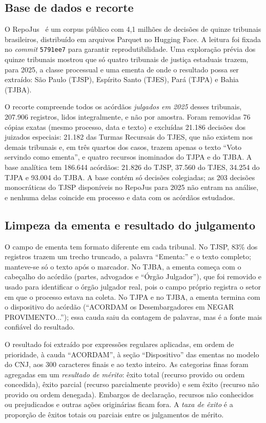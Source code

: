 \documentclass[conference]{IEEEtran}
\begin{document}
\subsection{Base de dados e recorte}

O RepoJus~\cite{repojus} é um corpus público com 4,1 milhões de decisões de
quinze tribunais brasileiros, distribuído em arquivos Parquet no Hugging Face.
A leitura foi fixada no \emph{commit} \texttt{5791ee7} para garantir
reprodutibilidade. Uma exploração prévia dos quinze tribunais mostrou que só
quatro tribunais de justiça estaduais trazem, para 2025, a classe processual e
uma ementa de onde o resultado possa ser extraído: São Paulo (TJSP), Espírito
Santo (TJES), Pará (TJPA) e Bahia (TJBA).

O recorte compreende todos os acórdãos \emph{julgados em 2025} desses
tribunais, 207.906 registros, lidos integralmente, e não por amostra. Foram
removidas 76 cópias exatas (mesmo processo, data e texto) e excluídas 21.186
decisões dos juizados especiais: 21.182 das Turmas Recursais do TJES, que não
existem nos demais tribunais e, em três quartos dos casos, trazem apenas o
texto ``Voto servindo como ementa'', e quatro recursos inominados do TJPA e do
TJBA. A base analítica tem 186.644 acórdãos:
21.826 do TJSP, 37.560 do TJES, 34.254 do TJPA e 93.004 do TJBA. A base contém
só decisões colegiadas; as 203 decisões monocráticas do TJSP disponíveis no
RepoJus para 2025 não entram na análise, e nenhuma delas coincide em processo e
data com os acórdãos estudados.

\subsection{Limpeza da ementa e resultado do julgamento}

O campo de ementa tem formato diferente em cada tribunal. No TJSP, 83\% dos
registros trazem um trecho truncado, a palavra ``Ementa:'' e o texto completo;
manteve-se só o texto após o marcador. No TJBA, a ementa começa com o
cabeçalho do acórdão (partes, advogados e ``Órgão Julgador''), que foi removido
e usado para identificar o órgão julgador real, pois o campo próprio registra o
setor em que o processo estava na coleta. No TJPA e no TJBA, a ementa termina
com o dispositivo do acórdão (``ACORDAM os Desembargadores em NEGAR
PROVIMENTO...''); essa cauda saiu da contagem de palavras, mas é a fonte mais
confiável do resultado.

O resultado foi extraído por expressões regulares aplicadas, em ordem de
prioridade, à cauda ``ACORDAM'', à seção ``Dispositivo'' das ementas no modelo
do CNJ, aos 300 caracteres finais e ao texto inteiro. As categorias finas
foram agregadas em um \emph{resultado de mérito}: êxito total (recurso provido
ou ordem concedida), êxito parcial (recurso parcialmente provido) e sem êxito
(recurso não provido ou ordem denegada). Embargos de declaração, recursos não
conhecidos ou prejudicados e outras ações originárias ficam fora. A \emph{taxa
de êxito} é a proporção de êxitos totais ou parciais entre os julgamentos de
mérito.
\end{document}
